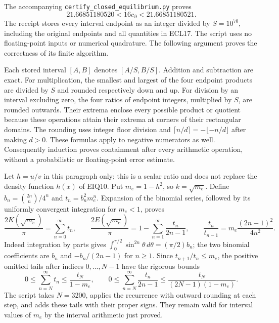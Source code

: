 \documentclass[11pt,a4paper]{article}
\begin{document}
The accompanying \texttt{certify\_closed\_equilibrium.py} proves
\begin{equation}\tag{ECL18}
\boxed{21.66851180520<16c_{\partial}<21.66851180521.}
\end{equation}
The receipt stores every interval endpoint as an integer divided by
$S=10^{70}$, including the original endpoints and all quantities in
ECL17. The script uses no floating-point inputs or numerical quadrature.
The following argument proves the correctness of its finite algorithm.

Each stored interval $[A,B]$ denotes $[A/S,B/S]$. Addition and
subtraction are exact. For multiplication, the smallest and largest
of the four endpoint products are divided by $S$ and rounded
respectively down and up. For division by an interval excluding zero,
the four ratios of endpoint integers, multiplied by $S$, are
rounded outwards. Their extrema enclose every possible product or
quotient because these operations attain their extrema at corners
of their rectangular domains. The rounding uses integer floor
division and $\lceil n/d\rceil=-\lfloor-n/d\rfloor$ after making
$d>0$. These formulas apply to negative numerators as well.
Consequently induction proves containment after every arithmetic
operation, without a probabilistic or floating-point error estimate.

Let $h=u/v$ in this paragraph only; this is a scalar ratio and
does not replace the density function $h(x)$ of EIQ10. Put
$m_e=1-h^2$, so $k=\sqrt{m_e}$. Define
$b_n=\binom{2n}{n}/4^n$ and $t_n=b_n^2m_e^n$.
Expansion of the binomial series, followed by its uniformly
convergent integration for $m_e<1$, proves
\begin{equation}\tag{ECL19}
\frac{2K(\sqrt{m_e})}{\pi}=\sum_{n=0}^{\infty}t_n,\qquad
\frac{2E(\sqrt{m_e})}{\pi}
=1-\sum_{n=1}^{\infty}\frac{t_n}{2n-1},\qquad
\frac{t_n}{t_{n-1}}=m_e\frac{(2n-1)^2}{4n^2}.
\end{equation}
Indeed integration by parts gives
$\int_0^{\pi/2}\sin^{2n}\theta\,d\theta=(\pi/2)b_n$;
the two binomial coefficients are $b_n$ and
$-b_n/(2n-1)$ for $n\geq1$. Since
$t_{n+1}/t_n\leq m_e$, the positive omitted tails after
indices $0,\ldots,N-1$ have the rigorous bounds
\begin{equation}\tag{ECL20}
0\leq\sum_{n=N}^{\infty}t_n\leq\frac{t_N}{1-m_e},
\qquad
0\leq\sum_{n=N}^{\infty}\frac{t_n}{2n-1}
\leq\frac{t_N}{(2N-1)(1-m_e)}.
\end{equation}
The script takes $N=3200$, applies the recurrence with outward
rounding at each step, and adds these tails with their proper
signs. They remain valid for interval values of $m_e$ by the
interval arithmetic just proved.
\end{document}
